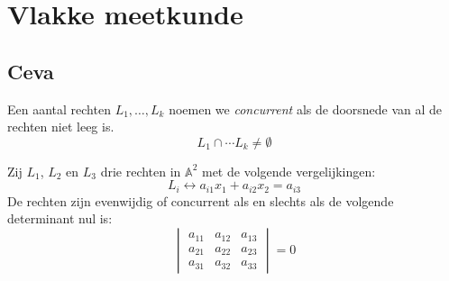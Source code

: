 \documentclass[main.tex]{subfiles}
\begin{document}
\chapter{Vlakke meetkunde}
\label{cha:vlakke-meetkunde}

\section{Ceva}
\label{sec:ceva}

\begin{de}
  Een aantal rechten $L_{1},\dotsc,L_{k}$ noemen we \emph{concurrent} als de doorsnede van al de rechten niet leeg is.
  \[ L_{1} \cap \dotsb L_{k} \neq \emptyset \]
\end{de}

\begin{lem}
  \label{lem:rechten-concurrent-determinant}
  Zij $L_{1}$, $L_{2}$ en $L_{3}$ drie rechten in $\mathbb{A}^{2}$ met de volgende vergelijkingen:
  \[ L_{i} \leftrightarrow a_{i1}x_{1} + a_{i2}x_{2} = a_{i3} \]
  De rechten zijn evenwijdig of concurrent als en slechts als de volgende determinant nul is:
  \[
  \begin{vmatrix}
    a_{11} & a_{12} & a_{13}\\
    a_{21} & a_{22} & a_{23}\\
    a_{31} & a_{32} & a_{33}
  \end{vmatrix}
  = 0
  \]


\end{lem}
\end{document}
